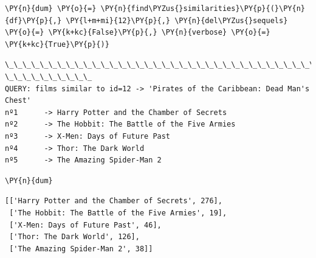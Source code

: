    \begin{tcolorbox}[breakable, size=fbox, boxrule=1pt, pad at break*=1mm,colback=cellbackground, colframe=cellborder]
\begin{Verbatim}[commandchars=\\\{\}]
\PY{n}{dum} \PY{o}{=} \PY{n}{find\PYZus{}similarities}\PY{p}{(}\PY{n}{df}\PY{p}{,} \PY{l+m+mi}{12}\PY{p}{,} \PY{n}{del\PYZus{}sequels} \PY{o}{=} \PY{k+kc}{False}\PY{p}{,} \PY{n}{verbose} \PY{o}{=} \PY{k+kc}{True}\PY{p}{)}
\end{Verbatim}
\end{tcolorbox}

    \begin{Verbatim}[commandchars=\\\{\}]
\_\_\_\_\_\_\_\_\_\_\_\_\_\_\_\_\_\_\_\_\_\_\_\_\_\_\_\_\_\_\_\_\_\_\_\_\_\_\_\_\_\_\_\_\_\_\_\_\_\_\_\_\_\_\_\_\_\_\_\_\_\_\_\_\_\_\_\_\_\_\_\_\_\_\_\_\_\_\_\_
\_\_\_\_\_\_\_\_\_\_
QUERY: films similar to id=12 -> 'Pirates of the Caribbean: Dead Man's Chest'
nº1      -> Harry Potter and the Chamber of Secrets
nº2      -> The Hobbit: The Battle of the Five Armies
nº3      -> X-Men: Days of Future Past
nº4      -> Thor: The Dark World
nº5      -> The Amazing Spider-Man 2
\end{Verbatim}

    \begin{tcolorbox}[breakable, size=fbox, boxrule=1pt, pad at break*=1mm,colback=cellbackground, colframe=cellborder]
\begin{Verbatim}[commandchars=\\\{\}]
\PY{n}{dum}
\end{Verbatim}
\end{tcolorbox}

            \begin{tcolorbox}[breakable, boxrule=.5pt, size=fbox, pad at break*=1mm, opacityfill=0]
\begin{Verbatim}[commandchars=\\\{\}]
[['Harry Potter and the Chamber of Secrets', 276],
 ['The Hobbit: The Battle of the Five Armies', 19],
 ['X-Men: Days of Future Past', 46],
 ['Thor: The Dark World', 126],
 ['The Amazing Spider-Man 2', 38]]
\end{Verbatim}
\end{tcolorbox}
        
